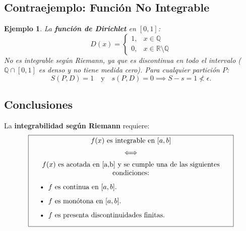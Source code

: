 \documentclass{article}
\newtheorem{ejemplo}{Ejemplo}
\begin{document}
\subsection*{Contraejemplo: Función No Integrable}
\begin{ejemplo}
    La \textbf{función de Dirichlet} en \([0, 1]\):
    \[
    D(x) = 
    \begin{cases}
        1, & x \in \mathbb{Q} \\
        0, & x \in \mathbb{R} \setminus \mathbb{Q}
    \end{cases}
    \]
    No es integrable según Riemann, ya que es discontinua en todo el intervalo (\( \mathbb{Q} \cap [0,1] \) es denso y no tiene medida cero). Para cualquier partición \( P \):
    \[
    S(P,D) = 1 \quad \text{y} \quad s(P,D) = 0 \implies S - s = 1 \not< \epsilon.
    \]
\end{ejemplo}

\subsection*{Conclusiones}
La \textbf{integrabilidad según Riemann} requiere: 
\[
\boxed{
    \parbox{10cm}{
            \centering
            \( f(x) \) es integrable en \([a, b]\) \\[0.5em]
            \(\iff\) \\[0.5em]
            \( f(x) \) es acotada en [a,b] y se cumple una de las siguientes condiciones:
            \begin{itemize}
                \item \(f\) es continua en \([a,b]\).
                \item \(f\) es monótona en \([a,b]\).
                \item \(f\) es presenta discontinuidades finitas.
            \end{itemize}
    }
}
\]
\end{document}
